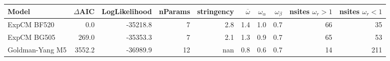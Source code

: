 \begin{tabular}{lrrrrrrrrr}
\toprule
           Model &  $\Delta$AIC &  LogLikelihood &  nParams &  stringency &  $\overline{\omega}$ &  $\omega_{\alpha}$ &  $\omega_{\beta}$ &  nsites $\omega_r > 1$ &  nsites $\omega_r < 1$ \\
\midrule
     ExpCM BF520 &          0.0 &       -35218.8 &        7 &         2.8 &                  1.4 &                1.0 &               0.7 &                     66 &                     35 \\
     ExpCM BG505 &        269.0 &       -35353.3 &        7 &         2.1 &                  1.3 &                0.9 &               0.7 &                     65 &                     53 \\
 Goldman-Yang M5 &       3552.2 &       -36989.9 &       12 &         nan &                  0.8 &                0.6 &               0.7 &                     14 &                    211 \\
\bottomrule
\end{tabular}
